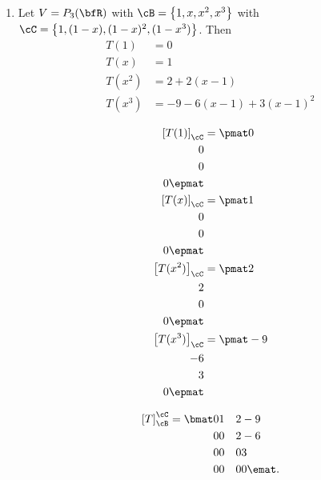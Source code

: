 \begin{example}
\begin{enumerate}[label = (\arabic*)]
            \item Let $V = P_3(\bfR)$ with $\cB = \left\{ 1,x,x^2,x^3 \right\}$ with $\cC = \left\{1,(1-x), (1-x)^2, (1-x^3)  \right\}$. Then
                \begin{equation*}
                \begin{split}
                    T(1) &= 0 \\
                    T(x) &= 1 \\
                    T(x^2) &= 2 + 2(x-1) \\
                    T(x^3) &= -9 - 6(x-1) + 3(x-1)^2
                \end{split}
                \end{equation*}

                \begin{equation*}
                \begin{split}
                    \left[ T(1) \right]_\cC & = \pmat 0 \\ 0 \\ 0 \\ 0\epmat \\
                    \left[ T(x) \right]_\cC & = \pmat 1 \\ 0 \\ 0 \\ 0\epmat\\
                    \left[ T(x^2) \right]_\cC & = \pmat 2 \\ 2 \\ 0 \\ 0\epmat\\
                    \left[ T(x^3) \right]_\cC & = \pmat -9 \\ -6 \\ 3 \\ 0\epmat
                \end{split}
                \end{equation*}

                \begin{equation*}
                \begin{split}
                    \left[ T \right]_\cB ^\cC = 
                    \bmat 
                    0 & 1 & 2 & -9 \\
                    0 & 0 & 2 & -6 \\
                    0 & 0 & 0 & 3 \\
                    0 & 0 & 0 & 0
                    \emat.
                \end{split}
                \end{equation*}
        \end{enumerate}
    \end{example}

